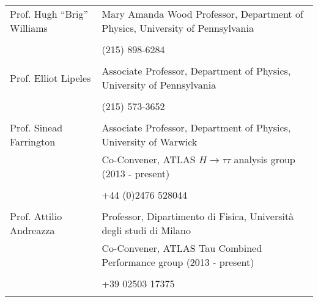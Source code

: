 \documentclass{resume2}
\begin{document}
\begin{resume}
\vspace{0.5cm}
\noindent\begin{tabular}{l l}
Prof. Hugh ``Brig'' Williams & Mary Amanda Wood Professor, Department of Physics, University of Pennsylvania \\
                             & \underline{\color{blue}{\url{williams@physics.upenn.edu}}} \\
                             & (215) 898-6284 \\
& \\
Prof. Elliot Lipeles & Associate Professor, Department of Physics, University of Pennsylvania \\
                     & \underline{\color{blue}{\url{lipeles@hep.upenn.edu}}} \\
                     & (215) 573-3652 \\
& \\
Prof. Sinead Farrington & Associate Professor, Department of Physics, University of Warwick \\
                        & Co-Convener, ATLAS $H\!\rightarrow\!\tau\tau$ analysis group (2013 - present) \\
                        & \underline{\color{blue}{\url{sinead.farrington@cern.ch}}} \\
                        & +44 (0)2476 528044 \\
& \\
Prof. Attilio Andreazza & Professor, Dipartimento di Fisica, Universit\`{a} degli studi di Milano \\
                        & Co-Convener, ATLAS Tau Combined Performance group (2013 - present) \\
                        & \underline{\color{blue}{\url{attilio.andreazza@unimi.it}}} \\
                        & +39 02503 17375 \\
& \\
\end{tabular}


\end{resume}
\end{document}
